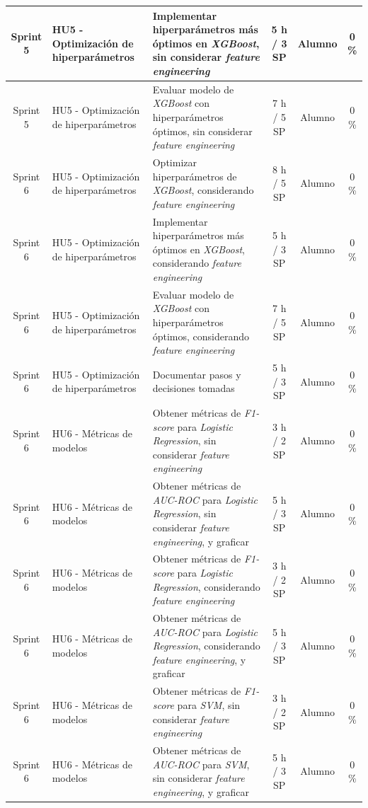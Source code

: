\documentclass[
11pt, %
]{charter}
\begin{document}
\begin{xltabular}{\linewidth}{@{}|c|X|X|c|c|c|@{}}
Sprint 5 & HU5 - Optimización de hiperparámetros & Implementar hiperparámetros más óptimos en \textit{XGBoost}, sin considerar \textit{feature engineering} & 5 h / 3 SP & Alumno & 0 \% \\ \hline
Sprint 5 & HU5 - Optimización de hiperparámetros & Evaluar modelo de \textit{XGBoost} con hiperparámetros óptimos, sin considerar \textit{feature engineering}  & 7 h / 5 SP & Alumno & 0 \% \\ \hline
Sprint 6 & HU5 - Optimización de hiperparámetros & Optimizar hiperparámetros de \textit{XGBoost}, considerando \textit{feature engineering}  & 8 h / 5 SP & Alumno & 0 \%\\ \hline
Sprint 6 & HU5 - Optimización de hiperparámetros & Implementar hiperparámetros más óptimos en \textit{XGBoost}, considerando \textit{feature engineering}  & 5 h / 3 SP & Alumno & 0 \% \\ \hline
Sprint 6 & HU5 - Optimización de hiperparámetros & Evaluar modelo de \textit{XGBoost} con hiperparámetros óptimos, considerando \textit{feature engineering}  & 7 h / 5 SP & Alumno & 0 \% \\ \hline
Sprint 6 & HU5 - Optimización de hiperparámetros & Documentar pasos y decisiones tomadas  & 5 h / 3 SP & Alumno & 0 \% \\ \hline
Sprint 6 & HU6 - Métricas de modelos & Obtener métricas de \textit{F1-score} para \textit{Logistic Regression}, sin  considerar \textit{feature engineering}  & 3 h / 2 SP & Alumno & 0 \%\\ \hline
Sprint 6 & HU6 - Métricas de modelos & Obtener métricas de \textit{AUC-ROC} para \textit{Logistic Regression}, sin  considerar \textit{feature engineering}, y graficar  & 5 h / 3 SP & Alumno & 0 \%\\ \hline
Sprint 6 & HU6 - Métricas de modelos & Obtener métricas de \textit{F1-score} para \textit{Logistic Regression}, considerando \textit{feature engineering}  & 3 h / 2 SP & Alumno & 0 \%\\ \hline
Sprint 6 & HU6 - Métricas de modelos & Obtener métricas de \textit{AUC-ROC} para \textit{Logistic Regression}, considerando \textit{feature engineering}, y graficar  & 5 h / 3 SP & Alumno & 0 \%\\ \hline
Sprint 6 & HU6 - Métricas de modelos & Obtener métricas de \textit{F1-score} para \textit{SVM}, sin  considerar \textit{feature engineering}  & 3 h / 2 SP & Alumno & 0 \%\\ \hline
Sprint 6 & HU6 - Métricas de modelos & Obtener métricas de \textit{AUC-ROC} para \textit{SVM}, sin  considerar \textit{feature engineering}, y graficar  & 5 h / 3 SP & Alumno & 0 \%\\ \hline

\end{xltabular}
\end{document}
